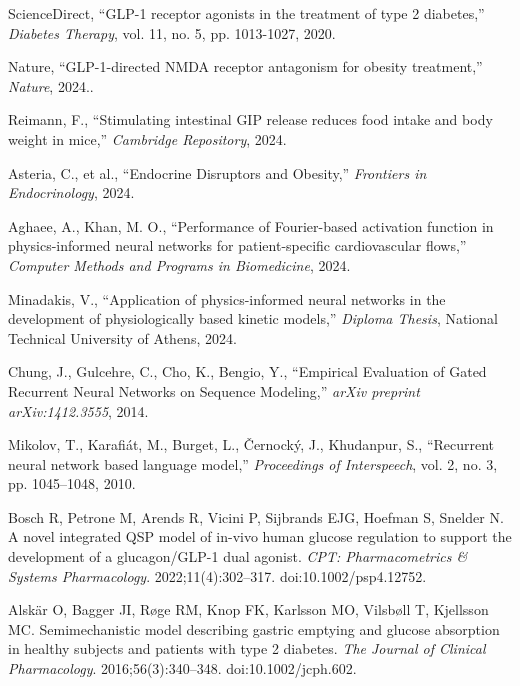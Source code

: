 \documentclass[9pt,shortpaper,twoside,web]{ieeecolor}
\begin{document}
\begin{thebibliography}{00}
ScienceDirect, ``GLP-1 receptor agonists in the treatment of type 2 diabetes,'' \textit{Diabetes Therapy}, vol. 11, no. 5, pp. 1013-1027, 2020.

Nature, ``GLP-1-directed NMDA receptor antagonism for obesity treatment,'' \textit{Nature}, 2024..

Reimann, F., ``Stimulating intestinal GIP release reduces food intake and body weight in mice,'' \textit{Cambridge Repository}, 2024. 

Asteria, C., et al., ``Endocrine Disruptors and Obesity,'' \textit{Frontiers in Endocrinology}, 2024. 

Aghaee, A., Khan, M. O., ``Performance of Fourier-based activation function in physics-informed neural networks for patient-specific cardiovascular flows,'' \textit{Computer Methods and Programs in Biomedicine}, 2024. 

Minadakis, V., ``Application of physics-informed neural networks in the development of physiologically based kinetic models,'' \textit{Diploma Thesis}, National Technical University of Athens, 2024. 

Chung, J., Gulcehre, C., Cho, K., Bengio, Y., ``Empirical Evaluation of Gated Recurrent Neural Networks on Sequence Modeling,'' \textit{arXiv preprint arXiv:1412.3555}, 2014. 

Mikolov, T., Karafiát, M., Burget, L., Černocký, J., Khudanpur, S., ``Recurrent neural network based language model,'' \textit{Proceedings of Interspeech}, vol. 2, no. 3, pp. 1045–1048, 2010.

Bosch R, Petrone M, Arends R, Vicini P, Sijbrands EJG, Hoefman S, Snelder N.
A novel integrated QSP model of in-vivo human glucose regulation to support the development of a glucagon/GLP-1 dual agonist.
\textit{CPT: Pharmacometrics \& Systems Pharmacology}. 2022;11(4):302–317.
doi:10.1002/psp4.12752. %

Alskär O, Bagger JI, Røge RM, Knop FK, Karlsson MO, Vilsbøll T, Kjellsson MC.
Semimechanistic model describing gastric emptying and glucose absorption in healthy subjects and patients with type 2 diabetes.
\textit{The Journal of Clinical Pharmacology}. 2016;56(3):340–348.
doi:10.1002/jcph.602. %


\end{thebibliography}
\end{document}
